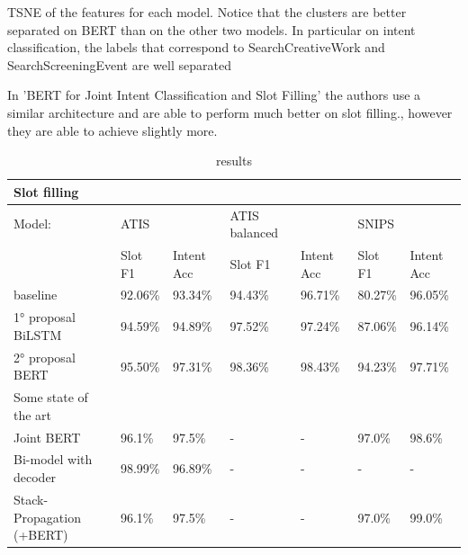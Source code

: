 \documentclass[a4paper]{article}
\begin{document}
\begin{table}[h!]
	\caption{TSNE of the features for each model. Notice that the clusters are better separated on BERT than on the other two models. In particular on intent classification, the labels that correspond to \textcolor{Myviolet}{SearchCreativeWork} and \textcolor{Mypurple}{SearchScreeningEvent} are well separated }
	\label{tab:embeddings}
\end{table}

In 'BERT for Joint Intent Classification and Slot Filling' \cite{https://doi.org/10.48550/arxiv.1902.10909} the authors use a similar architecture and are able to perform much better on slot filling., however they are able to achieve slightly more. 


\begin{table}[h!]
	\centering
	\begin{adjustbox}{max width=\textwidth}
		\begin{tabular}{*{7}{l}}%
			Slot filling & & &\\
			\hline
			Model: & ATIS & & ATIS balanced & & SNIPS &\\
					& Slot F1 & Intent Acc 	& Slot F1 & Intent Acc 	& Slot F1 & Intent Acc \\
			\hline
			baseline & 92.06\% & 93.34\%& 94.43\%& 96.71\%& 80.27\%& 96.05\% \\
			1° proposal BiLSTM & 94.59\%& 94.89\%& 97.52\%& 97.24\%& 87.06\% & 96.14\%\\
			2° proposal BERT& 95.50\%& 97.31\%& 98.36\%& 98.43\%& 94.23\%& 97.71\%\\
			Some state of the art & & & & & & \\
			Joint BERT \cite{https://doi.org/10.48550/arxiv.1902.10909} & 96.1\%& 97.5\%& - & - & 97.0\%& 98.6\%\\
			Bi-model with decoder\cite{wang-etal-2018-bi} & 98.99\% & 96.89\% & - & - & - & - \\
			Stack-Propagation (+BERT) \cite{qin-etal-2019-stack} & 96.1\% & 97.5\% & - & - & 97.0\% & 99.0\% \\
			\hline
		\end{tabular}
	\end{adjustbox}
		\caption{results}
	\label{tab:final_table}
\end{table}

\end{document}
